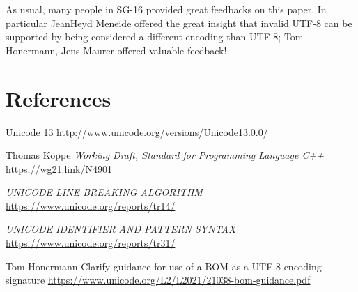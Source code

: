 \documentclass{wg21}
\begin{document}
As usual, many people in SG-16 provided great feedbacks on this paper.
In particular JeanHeyd Meneide offered the great insight that invalid UTF-8 can be supported by being considered a different encoding than UTF-8; Tom Honermann, Jens Maurer offered valuable feedback!


\section{References}
\renewcommand{\section}[2]{}%



\begin{thebibliography}{9}


Unicode 13\newline
\url{http://www.unicode.org/versions/Unicode13.0.0/}

Thomas Köppe
\emph{Working Draft, Standard for Programming Language C++}\newline
\url{https://wg21.link/N4901}

\emph{UNICODE LINE BREAKING ALGORITHM}\newline
\url{https://www.unicode.org/reports/tr14/}

\emph{UNICODE IDENTIFIER AND PATTERN SYNTAX}\newline
\url{https://www.unicode.org/reports/tr31/}

Tom Honermann
Clarify guidance for use of a BOM as a UTF-8 encoding signature
\url{https://www.unicode.org/L2/L2021/21038-bom-guidance.pdf}
    

\end{thebibliography}
\end{document}
